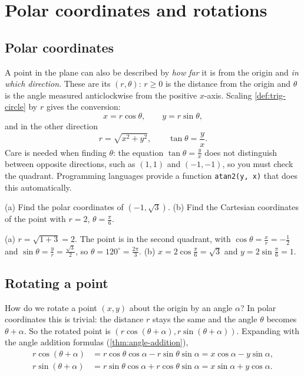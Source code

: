 \section{Polar coordinates and rotations}\label{sec:polar-rotation}

\subsection{Polar coordinates}

A point in the plane can also be described by \emph{how far} it is from the
origin and \emph{in which direction}. These are its
 $(r, \theta)$: $r \ge 0$ is the distance from the
origin and $\theta$ is the angle measured anticlockwise from the positive
$x$-axis. Scaling \cref{def:trig-circle} by $r$ gives the conversion:
\[
  x = r\cos\theta, \qquad y = r\sin\theta ,
\]
and in the other direction
\[
  r = \sqrt{x^2 + y^2}, \qquad \tan\theta = \frac{y}{x} .
\]
Care is needed when finding $\theta$: the equation $\tan\theta = \frac yx$
does not distinguish between opposite directions, such as $(1, 1)$ and
$(-1, -1)$, so you must check the quadrant. Programming languages provide a
function \texttt{atan2(y, x)} that does this automatically.

\begin{example}\label{ex:polar}
(a) Find the polar coordinates of $(-1, \sqrt3)$.
(b) Find the Cartesian coordinates of the point with $r = 2$,
$\theta = \frac{\pi}{6}$.

\sol (a) $r = \sqrt{1 + 3} = 2$. The point is in the second quadrant, with
$\cos\theta = \frac{x}{r} = -\frac12$ and $\sin\theta = \frac{y}{r} =
\frac{\sqrt3}{2}$, so $\theta = 120^\circ = \frac{2\pi}{3}$.
(b) $x = 2\cos\frac{\pi}{6} = \sqrt3$ and $y = 2\sin\frac{\pi}{6} = 1$.
\end{example}

\subsection{Rotating a point}

How do we rotate a point $(x, y)$ about the origin by an angle $\alpha$? In
polar coordinates this is trivial: the distance $r$ stays the same and the
angle $\theta$ becomes $\theta + \alpha$. So the rotated point is
$(r\cos(\theta + \alpha), r\sin(\theta + \alpha))$. Expanding with the angle
addition formulas (\cref{thm:angle-addition}),
\begin{align*}
  r\cos(\theta + \alpha) &= r\cos\theta\cos\alpha - r\sin\theta\sin\alpha
    = x\cos\alpha - y\sin\alpha,\\
  r\sin(\theta + \alpha) &= r\sin\theta\cos\alpha + r\cos\theta\sin\alpha
    = x\sin\alpha + y\cos\alpha .
\end{align*}

